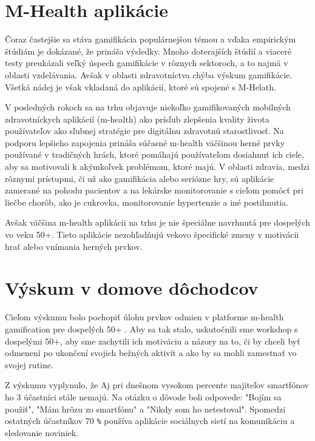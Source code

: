\documentclass[10pt,twoside,slovak,a4paper]{article}
\begin{document}
\section{M-Health aplikácie} \label{m_health_aplikacie}
Čoraz častejšie sa stáva gamifikácia populárnejšou témou a vďaka empirickým štúdiám je dokázané, že prináša výsledky. Mnoho doterajších štúdií a viaceré testy preukázali veľký úspech gamifikácie v rôznych sektoroch, a to najmä v oblasti vzdelávania. Avšak v oblasti zdravotníctva chýba výskum gamifikácie. Všetká nádej je však vkladaná do aplikácií, ktoré sú spojené s M-Helath. 

V posledných rokoch sa na trhu objavuje niekoľko gamifikovaných mobilných zdravotníckych aplikácií (m-health) ako prísľub zlepšenia kvality života používateľov ako sľubnej stratégie pre digitálnu zdravotnú starostlivosť. Na podporu lepšieho zapojenia prináša súčasné m-health väčšinou herné prvky používané v tradičných hrách, ktoré pomáhajú používateľom dosiahnuť ich ciele, aby sa motivovali k akýmkoľvek problémom, ktoré majú. V oblasti zdravia, medzi rôznymi prístupmi, či už ako gamifikácia alebo seriózne hry, sú aplikácie zamerané na pohodu pacientov a na lekárske monitorovanie s cieľom pomôcť pri liečbe chorôb, ako je cukrovka, monitorovanie hypertenzie a iné postihnutia.

Avšak väčšina m-health aplikácii na trhu je nie špeciálne navrhnutá pre dospelých vo veku 50+. Tieto aplikácie nezohľadňujú vekovo špecifické zmeny v motivácii hrať alebo vnímania herných prvkov.

\section{Výskum v domove dôchodcov} \label{vyskum_v_domove_dochodcov}
Cieľom výskumu bolo pochopiť úlohu prvkov odmien v platforme m-health gamification pre dospelých 50+ \cite{GamificationElements:Adults}. Aby sa tak stalo, uskutočnili sme workshop s dospelými 50+, aby sme zachytili ich motiváciu a názory na to, či by chceli byť odmenení po ukončení svojich bežných aktivít a ako by sa mohli zamestnať vo svojej rutine.

Z výskumu vyplynulo, že Aj pri dnešnom vysokom percente majiteľov smartfónov ho 3 účastníci stále nemajú. Na otázku o dôvode boli odpovede: "Bojím sa použiť", "Mám hrôzu zo smartfónu" a "Nikdy som ho netestoval".  Spomedzi ostatných účastníkov 70 \texttt{\%} používa aplikácie sociálnych sietí na komunikáciu a sledovanie noviniek.
\end{document}
